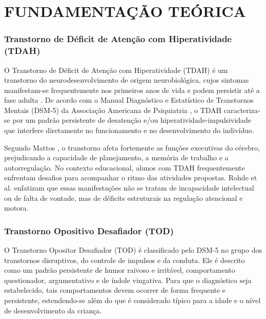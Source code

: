 
\chapter{FUNDAMENTAÇÃO TEÓRICA}
\label{chap:fundamentacao}

\subsection{Transtorno de Déficit de Atenção com Hiperatividade (TDAH)}

O Transtorno de Déficit de Atenção com Hiperatividade (TDAH) é um transtorno do neurodesenvolvimento de origem neurobiológica, cujos sintomas manifestam-se frequentemente nos primeiros anos de vida e podem persistir até a fase adulta \cite{barkley2015}. De acordo com o Manual Diagnóstico e Estatístico de Transtornos Mentais (DSM-5) da Associação Americana de Psiquiatria \cite{apa2014}, o TDAH caracteriza-se por um padrão persistente de desatenção e/ou hiperatividade-impulsividade que interfere diretamente no funcionamento e no desenvolvimento do indivíduo.

Segundo Mattos \cite{mattos2003}, o transtorno afeta fortemente as funções executivas do cérebro, prejudicando a capacidade de planejamento, a memória de trabalho e a autorregulação. No contexto educacional, alunos com TDAH frequentemente enfrentam desafios para acompanhar o ritmo das atividades propostas. Rohde et al. \cite{rohde2004} enfatizam que essas manifestações não se tratam de incapacidade intelectual ou de falta de vontade, mas de déficits estruturais na regulação atencional e motora.

\subsection{Transtorno Opositivo Desafiador (TOD)}

O Transtorno Opositor Desafiador (TOD) é classificado pelo DSM-5 \cite{apa2014} no grupo dos transtornos disruptivos, do controle de impulsos e da conduta. Ele é descrito como um padrão persistente de humor raivoso e irritável, comportamento questionador, argumentativo e de índole vingativa. Para que o diagnóstico seja estabelecido, tais comportamentos devem ocorrer de forma frequente e persistente, estendendo-se além do que é considerado típico para a idade e o nível de desenvolvimento da criança.

